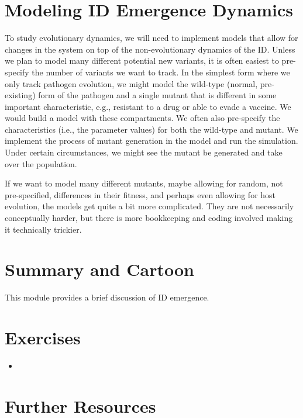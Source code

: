 \documentclass[]{book}
\theoremstyle{definition}
\theoremstyle{definition}
\theoremstyle{definition}
\theoremstyle{remark}
\begin{document}
\section{Modeling ID Emergence
Dynamics}\label{modeling-id-emergence-dynamics}

To study evolutionary dynamics, we will need to implement models that
allow for changes in the system on top of the non-evolutionary dynamics
of the ID. Unless we plan to model many different potential new
variants, it is often easiest to pre-specify the number of variants we
want to track. In the simplest form where we only track pathogen
evolution, we might model the wild-type (normal, pre-existing) form of
the pathogen and a single mutant that is different in some important
characteristic, e.g., resistant to a drug or able to evade a vaccine. We
would build a model with these compartments. We often also pre-specify
the characteristics (i.e., the parameter values) for both the wild-type
and mutant. We implement the process of mutant generation in the model
and run the simulation. Under certain circumstances, we might see the
mutant be generated and take over the population.

If we want to model many different mutants, maybe allowing for random,
not pre-specified, differences in their fitness, and perhaps even
allowing for host evolution, the models get quite a bit more
complicated. They are not necessarily conceptually harder, but there is
more bookkeeping and coding involved making it technically trickier.

\section{Summary and Cartoon}\label{summary-and-cartoon-15}

This module provides a brief discussion of ID emergence.

\section{Exercises}\label{exercises-15}

\begin{itemize}
\item
\end{itemize}

\section{Further Resources}\label{further-resources-15}
\end{document}
